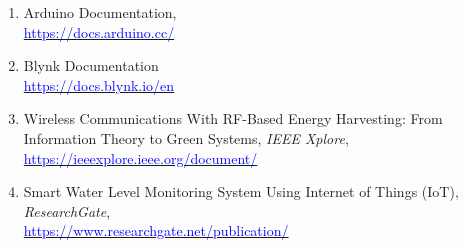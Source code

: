 \begin{enumerate}
  \item Arduino Documentation, \\
  \textcolor{blue}\faLink \hspace{0.1cm} \href{https://docs.arduino.cc/}{\textcolor{blue}{https://docs.arduino.cc/}}
  
  \item Blynk Documentation \\
  \textcolor{blue}\faLink \hspace{0.1cm} \href{https://docs.blynk.io/en}{\textcolor{blue}{https://docs.blynk.io/en}}
  
  \item Wireless Communications With RF-Based Energy Harvesting: From Information Theory to Green Systems, \textit{IEEE Xplore}, \\
  \textcolor{blue}\faLink \hspace{0.1cm} \href{https://ieeexplore.ieee.org/document/8125666}{\textcolor{blue}{https://ieeexplore.ieee.org/document/}}
  
  \item Smart Water Level Monitoring System Using Internet of Things (IoT), \textit{ResearchGate},  \\
  \textcolor{blue}\faLink \hspace{0.1cm} \href{https://www.researchgate.net/publication/369408401_Smart_Water_Level_Monitoring_System_Using_Internet_of_Things_IoT}{\textcolor{blue}{https://www.researchgate.net/publication/}}
\end{enumerate}


